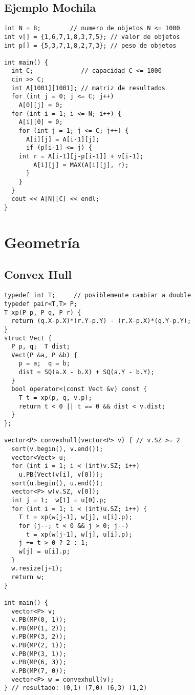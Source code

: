 \documentclass[10pt, a4, oneside]{article}
\begin{document}
\subsection{Ejemplo Mochila}
\begin{verbatim}
int N = 8;        // numero de objetos N <= 1000
int v[] = {1,6,7,1,8,3,7,5}; // valor de objetos
int p[] = {5,3,7,1,8,2,7,3}; // peso de objetos

int main() {
  int C;             // capacidad C <= 1000
  cin >> C;
  int A[1001][1001]; // matriz de resultados
  for (int j = 0; j <= C; j++)
    A[0][j] = 0;
  for (int i = 1; i <= N; i++) {
    A[i][0] = 0;
    for (int j = 1; j <= C; j++) {
      A[i][j] = A[i-1][j];
      if (p[i-1] <= j) {
    int r = A[i-1][j-p[i-1]] + v[i-1];
        A[i][j] = MAX(A[i][j], r);
      }
    }
  }
  cout << A[N][C] << endl;
}
\end{verbatim}

\section{Geometría}
\subsection{Convex Hull}
\begin{verbatim}
typedef int T;     // posiblemente cambiar a double
typedef pair<T,T> P;
T xp(P p, P q, P r) {
  return (q.X-p.X)*(r.Y-p.Y) - (r.X-p.X)*(q.Y-p.Y);
}
struct Vect {
  P p, q;  T dist;
  Vect(P &a, P &b) {
    p = a;  q = b;
    dist = SQ(a.X - b.X) + SQ(a.Y - b.Y);
  }
  bool operator<(const Vect &v) const {
    T t = xp(p, q, v.p);
    return t < 0 || t == 0 && dist < v.dist;
  }
};

vector<P> convexhull(vector<P> v) { // v.SZ >= 2
  sort(v.begin(), v.end());
  vector<Vect> u;
  for (int i = 1; i < (int)v.SZ; i++)
    u.PB(Vect(v[i], v[0]));
  sort(u.begin(), u.end());
  vector<P> w(v.SZ, v[0]);
  int j = 1;  w[1] = u[0].p;
  for (int i = 1; i < (int)u.SZ; i++) {
    T t = xp(w[j-1], w[j], u[i].p);
    for (j--; t < 0 && j > 0; j--)
      t = xp(w[j-1], w[j], u[i].p);
    j += t > 0 ? 2 : 1;
    w[j] = u[i].p;
  }
  w.resize(j+1);
  return w;
}

int main() {
  vector<P> v;
  v.PB(MP(0, 1));
  v.PB(MP(1, 2));
  v.PB(MP(3, 2));
  v.PB(MP(2, 1));
  v.PB(MP(3, 1));
  v.PB(MP(6, 3));
  v.PB(MP(7, 0));
  vector<P> w = convexhull(v);
} // resultado: (0,1) (7,0) (6,3) (1,2)
\end{verbatim}
\end{document}
